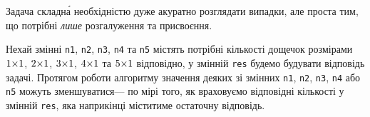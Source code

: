 \Tutorial	
Задача складн\'{а} необхідністю дуже акуратно розглядати випадки, але проста тим, що потрібні \emph{лише} розгалуження та присвоєння.

Нехай змінні \texttt{n1}, \texttt{n2}, \texttt{n3}, \texttt{n4} та \texttt{n5} містять потрібні кількості дощечок розмірами $1{\times}1$, $2{\times}1$, $3{\times}1$, $4{\times}1$ та $5{\times}1$ відповідно, у змінній \texttt{res} будемо будувати відповідь задачі. Протягом роботи алгоритму значення деяких зі змінних \texttt{n1}, \texttt{n2}, \texttt{n3}, \texttt{n4} або \texttt{n5} можуть зменшуватися\nolinebreak[3] --- по мірі того, як враховуємо відповідні кількості у змінній \texttt{res}, яка наприкінці міститиме остаточну відповідь. 






